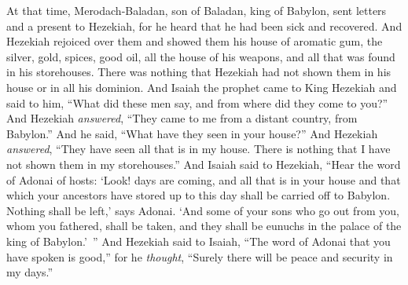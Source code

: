 \begin{biblechapter} %
 At that time, Merodach-Baladan, son of Baladan, king of Babylon, sent letters and a present to Hezekiah, for he heard that he had been sick and recovered.
\verse And Hezekiah rejoiced over them and showed them his house of aromatic gum, the silver, gold, spices, good oil, all the house of his weapons, and all that was found in his storehouses. There was nothing that Hezekiah had not shown them in his house or in all his dominion.
\verse And Isaiah the prophet came to King Hezekiah and said to him, “What did these men say, and from where did they come to you?” And Hezekiah \textit{answered}, “They came to me from a distant country, from Babylon.”
\verse And he said, “What have they seen in your house?” And Hezekiah \textit{answered}, “They have seen all that is in my house. There is nothing that I have not shown them in my storehouses.”
\verse And Isaiah said to Hezekiah, “Hear the word of Adonai of hosts:
\verse ‘Look! days are coming, and all that is in your house and that which your ancestors have stored up to this day shall be carried off to Babylon. Nothing shall be left,’ says Adonai.
\verse ‘And some of your sons who go out from you, whom you fathered, shall be taken, and they shall be eunuchs in the palace of the king of Babylon.’ ”
\verse And Hezekiah said to Isaiah, “The word of Adonai that you have spoken is good,” for he \textit{thought}, “Surely there will be peace and security in my days.”
\end{biblechapter}

